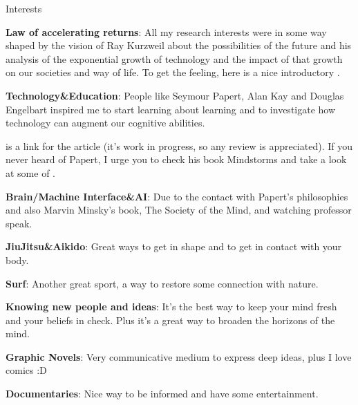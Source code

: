 \begin{rubric}{Interests}{
    \entry* \textbf{Law of accelerating returns}: All my research interests were
    in some way shaped by the vision of Ray Kurzweil about the possibilities of
    the future and his analysis of the exponential growth of technology and the
    impact of that growth on our societies and way of life. To get the feeling,
    here is a nice introductory
    .



    \entry* \textbf{Technology\&Education}: People like 
    Seymour Papert, Alan Kay and Douglas Engelbart inspired me to
    start learning about learning and to investigate how technology can augment
    our cognitive abilities.
    
    is a link for the article (it's work in progress, so any review is
    appreciated). If you never heard of Papert, I urge you to check his book
    Mindstorms and take a look at some of
    .

    \entry* \textbf{Brain/Machine Interface\&AI}: Due to the contact with
    Papert's philosophies and also Marvin Minsky's book, The Society of the
    Mind, and watching professor 
    speak.

    \entry* \textbf{JiuJitsu\&Aikido}: Great ways to get in shape and to get in
        contact with your body.

    \entry* \textbf{Surf}: Another great sport, a way to restore some connection
    with nature.

    \entry* \textbf{Knowing new people and ideas}: It's the best way to keep
    your mind fresh and your beliefs in check. Plus it's a great way to broaden
    the horizons of the mind.

    \entry* \textbf{Graphic Novels}: Very communicative medium to express deep
    ideas, plus I love comics :D

    \entry* \textbf{Documentaries}: Nice way to be informed and have some
    entertainment. 

}\end{rubric}

